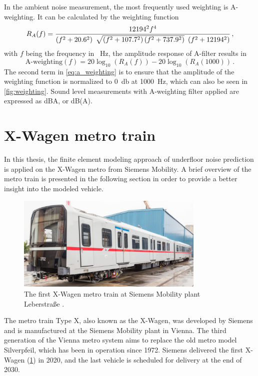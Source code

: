 In the ambient noise measurement, the most frequently used weighting is A-weighting. It can be calculated by the weighting function \cite{IEC61672}
\begin{equation}
	 R_A(f) = {12194^2 f^4 \over \left(f^2 + 20.6^2\right)\ \sqrt{\left(f^2 + 107.7^2\right)\left(f^2 + 737.9^2\right)}\ \left(f^2 + 12194^2\right)}\,,
\end{equation}
with $f$ being the frequency in \SI{}{\hertz}, the amplitude response of A-filter results in
\begin{equation}
	\text{A-weighting}(f) = 20\log_{10}\left(R_A(f)\right) - 20\log_{10}\left(R_A(1000)\right) \,. \label{eq:a_weighting}
\end{equation}
The second term in \cref{eq:a_weighting} is to ensure that the amplitude of the weighting function is normalized to \SI{0}{\decibel} at \SI{1000}{\hertz}, which can also be seen in \cref{fig:weighting}. Sound level measurements with A-weighting filter applied are expressed as dBA, or dB(A).

\newpage
\section{X-Wagen metro train}
\label{section:ubx_geometry}

In this thesis, the finite element modeling approach of underfloor noise prediction is applied on the X-Wagen metro from Siemens Mobility. A brief overview of the metro train is presented in the following section in order to provide a better insight into the modeled vehicle.

\begin{figure}[H]
	\centering
	\includegraphics[width=0.8\textwidth]{fig/ubx_wiener_linien.PNG}
	\caption{The first X-Wagen metro train at Siemens Mobility plant Leberstraße \cite{foto_ubx}.}
	\label{fig:ubx_foto}
\end{figure}

The metro train Type X, also known as the X-Wagen, was developed by Siemens and is manufactured at the Siemens Mobility plant in Vienna. The third generation of the Vienna metro system aims to replace the old metro model Silverpfeil, which has been in operation since 1972. Siemens delivered the first X-Wagen (\cref{fig:ubx_foto}) in 2020, and the last vehicle is scheduled for delivery at the end of 2030.

